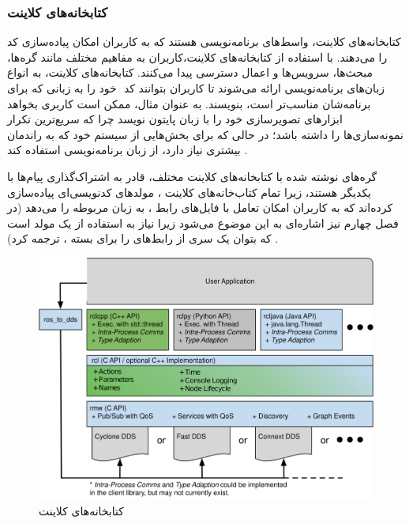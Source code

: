 \subsubsection{کتابخانه‌های کلاینت}
کتابخانه‌های کلاینت،‌ واسط‌های برنامه‌نویسی هستند که به کاربران امکان پیاده‌سازی کد  را می‌دهند. با استفاده از کتابخانه‌های کلاینت،‌کاربران به مفاهیم مختلف مانند گره‌ها، مبحث‌ها، سرویس‌ها و اعمال دسترسی پیدا می‌کنند. کتابخانه‌های کلاینت، به انواع زبان‌های برنامه‌نویسی ارائه می‌شوند تا کاربران بتوانند کد ‌ خود را به زبانی که برای برنامه‌شان مناسب‌تر است،‌ بنویسند. به عنوان مثال، ممکن است کاربری بخواهد ابزار‌های تصویر‌سازی خود را با زبان پایتون نویسد چرا که سریع‌ترین تکرار نمونه‌سازی‌ها را داشته باشد؛ در حالی که برای بخش‌هایی از سیستم خود که به راندمان بیشتری نیاز دارد،‌ از زبان برنامه‌نویسی  استفاده کند  \cite{ROS2:Humble_Documentation}.

گره‌های نوشته شده با کتابخانه‌های کلاینت مختلف،‌ قادر به اشتراک‌گذاری پیام‌ها با یکدیگر هستند، زیرا تمام کتاب‌خانه‌های کلاینت ، مولدهای کدنویسی‌ای پیاده‌سازی کرده‌اند که به کاربران امکان تعامل با فایل‌های رابط ، به زبان مربوطه را می‌دهد (در فصل چهارم نیز اشاره‌ای به این موضوع می‌شود زیرا نیاز به استفاده از یک مولد است که بتوان یک سری از رابط‌های  را برای بسته‌ ، ترجمه کرد) \cite{ROS2:Humble_Documentation}.

\begin{figure}[h!]
    \centering
    \includegraphics[width=1\linewidth]{figures/ROS2_Client_Library_API_Stack.png}
    \caption{کتابخانه‌های کلاینت  \cite{doi:10.1126/scirobotics.abm6074}}
    \label{fig:ROS2_Client_Library_API_Stack}
\end{figure}

